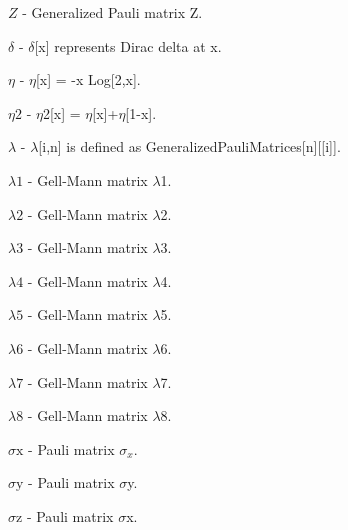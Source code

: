 \documentclass[a4paper,12pt]{article}
\begin{document}
\textbf{$ Z $ } - Generalized Pauli matrix Z.$  $

\textbf{$ \delta  $ } - $\delta $[x] represents Dirac delta at x.$  $

\textbf{$ \eta  $ } - $\eta $[x] = -x Log[2,x].$  $

\textbf{$ \text{$\eta $2} $ } - $\eta $2[x] = $\eta $[x]+$\eta $[1-x].$  $

\textbf{$ \lambda  $ } - $\lambda $[i,n] is defined as GeneralizedPauliMatrices[n][[i]].$  $

\textbf{$ \text{$\lambda $1} $ } - Gell-Mann matrix $\lambda $1.$  $

\textbf{$ \text{$\lambda $2} $ } - Gell-Mann matrix $\lambda $2.$  $

\textbf{$ \text{$\lambda $3} $ } - Gell-Mann matrix $\lambda $3.$  $

\textbf{$ \text{$\lambda $4} $ } - Gell-Mann matrix $\lambda $4.$  $

\textbf{$ \text{$\lambda $5} $ } - Gell-Mann matrix $\lambda $5.$  $

\textbf{$ \text{$\lambda $6} $ } - Gell-Mann matrix $\lambda $6.$  $

\textbf{$ \text{$\lambda $7} $ } - Gell-Mann matrix $\lambda $7.$  $

\textbf{$ \text{$\lambda $8} $ } - Gell-Mann matrix $\lambda $8.$  $

\textbf{$ \text{$\sigma $x} $ } - Pauli matrix $ \sigma _x. $

\textbf{$ \text{$\sigma $y} $ } - Pauli matrix $\sigma $y.$  $

\textbf{$ \text{$\sigma $z} $ } - Pauli matrix $\sigma $x.$  $
\end{document}
